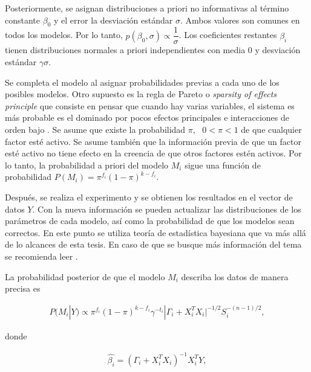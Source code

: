 Posteriormente, se asignan distribuciones a priori no informativas al término constante $\beta_0$ y el error la desviación estándar $\sigma$. Ambos valores son comunes en todos los modelos. Por lo tanto, $p( \beta_0, \sigma) \propto \dfrac{1}{\sigma}$. Los coeficientes restantes $\beta_i$ tienen distribuciones normales a priori independientes con media 0 y desviación estándar $\gamma \sigma$. 

Se completa el modelo al asignar probabilidades previas a cada uno de los posibles modelos. Otro supuesto es la regla de Pareto o \textit{sparsity of effects principle} que consiste en pensar que cuando hay varias variables, el sistema es más probable es el dominado por pocos efectos principales e interacciones de orden bajo \cite{montgomery2017design}. Se asume que existe la probabilidad $\pi, \text{ } 0 < \pi < 1$ de que cualquier factor esté activo. Se asume también que la información previa de que un factor esté activo no tiene efecto en la creencia de que otros factores estén activos. Por lo tanto, la probabilidad a priori del modelo $M_i$ sigue una función de probabilidad $P(M_i) = \pi ^{f_i} (1 - \pi)^{k-f_i}$. 

Después, se realiza el experimento y se obtienen los resultados en el vector de datos \textbf{$Y$}. Con la nueva información se pueden actualizar las distribuciones de los parámetros de cada modelo, así como la probabilidad de que los modelos sean correctos. En este punto se utiliza teoría de estadística bayesiana que va más allá de lo alcances de esta tesis. En caso de que se busque más información del tema se recomienda leer \cite{mendoza_bayesiana}. 

La probabilidad posterior de que el modelo $M_i$ describa los datos de manera precisa es  


\begin{equation*}
	\begin{aligned}
		P(M_i | Y) \propto  \pi ^{f_i} (1 - \pi)^{k-f_i} \gamma^{-t_i} |\Gamma_i + X_i^{T} X_i |^{-1/2} S_i^{-(n-1)/2}, 		
	\end{aligned}
\end{equation*}

\noindent donde

\begin{equation} \label{betai}
	\begin{aligned}
		\hat{\beta_i} = (\Gamma_i + X_i^{T} X_i)^{-1} X_i^{T} Y, 
	\end{aligned}
\end{equation}

